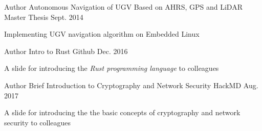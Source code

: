 

\begin{cventries}

  \cventry
    {Author} %
    {Autonomous Navigation of UGV Based on AHRS, GPS and LiDAR} %
    {Master Thesis} %
    {Sept. 2014} %
    {
      \begin{cvitems} %
        \item {Implementing UGV navigation algorithm on Embedded Linux}
      \end{cvitems}
    }

  \cventry
    {Author} %
    {Intro to Rust} %
    {Github} %
    {Dec. 2016} %
    {
      \begin{cvitems} %
          \item {A slide for introducing the \textit{Rust programming language} to colleagues}
      \end{cvitems}
    }

  \cventry
    {Author} %
    {Brief Introduction to Cryptography and Network Security} %
    {HackMD} %
    {Aug. 2017} %
    {
      \begin{cvitems} %
          \item {A slide for introducing the the basic concepts of cryptography and network security to colleagues}
      \end{cvitems}
    }

\end{cventries}
